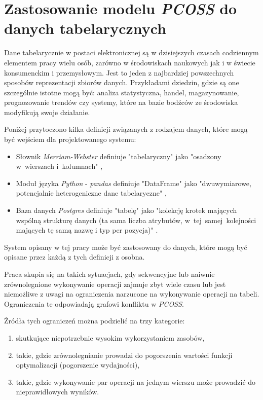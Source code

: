 \documentclass[brudnopis]{xmgr}
\begin{document}
\chapter{Zastosowanie modelu \emph{PCOSS} do danych tabelarycznych}

Dane tabelarycznie w postaci elektronicznej są w dzisiejszych czasach codziennym elementem pracy wielu osób, zarówno w środowiskach naukowych jak i w świecie konsumenckim i przemysłowym. Jest to jeden z najbardziej powszechnych sposobów reprezentacji zbiorów danych. Przykładami dziedzin, gdzie są one szczególnie istotne mogą być: analiza statystyczna, handel, magazynowanie, prognozowanie trendów czy systemy, które na bazie bodźców ze środowiska modyfikują swoje działanie.
\medskip

Poniżej przytoczono kilka definicji związanych z rodzajem danych, które mogą być wejściem dla projektowanego systemu:
\begin{itemize}
    \item Słownik \emph{Merriam-Webster} definiuje "tabelaryczny" jako "osadzony\\
    w~wierszach i~kolumnach" \cite{MW:TAB},
    \item Moduł języka \emph{Python} - \emph{pandas} definiuje "DataFrame" jako "dwuwymiarowe, potencjalnie heterogeniczne dane tabelaryczne" \cite{P:DF},
    \item Baza danych \emph{Postgres} definiuje "tabelę" jako "kolekcję krotek mających wspólną strukturę danych (ta sama liczba atrybutów, w~tej~samej~kolejności mających tę samą nazwę i typ per pozycja)" \cite{PSQL:TAB}.
\end{itemize}
\medskip

System opisany w tej pracy może być zastosowany do danych, które mogą być opisane przez każdą z tych definicji z osobna.

Praca skupia się na takich sytuacjach, gdy sekwencyjne lub naiwnie zrównolegnione wykonywanie operacji zajmuje zbyt wiele czasu lub jest niemożliwe z uwagi na ograniczenia narzucone na wykonywanie operacji na tabeli.
Ograniczenia te odpowiadają grafowi konfliktu w \emph{PCOSS}.
\medskip

\newpage

Źródła tych ograniczeń można podzielić na trzy kategorie:
\begin{enumerate}
    \item skutkujące niepotrzebnie wysokim wykorzystaniem zasobów,
    \item takie, gdzie zrównolegnianie prowadzi do pogorszenia wartości funkcji optymalizacji (pogorszenie wydajności),
    \item takie, gdzie wykonywanie par operacji na jednym wierszu może prowadzić do nieprawidłowych wyników.
\end{enumerate}
\medskip
\end{document}
